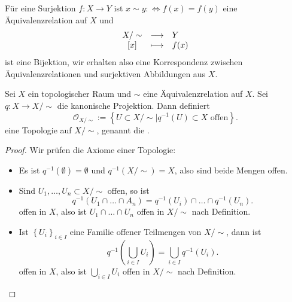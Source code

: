  \begin{recap}
     Für eine Surjektion $f: X \to  Y$ ist $x\sim y :\iff  f(x) = f(y)$ eine Äquivalenzrelation auf $X$ und
             \begin{equation*}
             \begin{array}{c c l} 
             X / \sim  & \longrightarrow & Y \\
             \left[x\right] & \longmapsto &  f(x)
             \end{array}
         \end{equation*}
ist eine Bijektion, wir erhalten also eine Korrespondenz zwischen Äquivalenzrelationen und surjektiven Abbildungen aus $X$.
\end{recap}

\begin{theoremdef}[Quotiententopologie]\label{def:quotiententopologie}
    Sei $X$ ein topologischer Raum und  $\sim $ eine Äquivalenzrelation auf $X$. Sei  $q: X \to  X / \sim $ die kanonische Projektion. Dann definiert
    \[
        \mathcal{O}_{X / \sim } := \left \{U\subset X / \sim \mid  q^{-1}(U) \subset X \text{ offen}\right\} 
    .\] 
    eine Topologie auf $X / \sim $, genannt die . 
\end{theoremdef}
\begin{proof}
    Wir prüfen die Axiome einer Topologie:
    \begin{itemize}
        \item Es ist $q^{-1}(\emptyset) = \emptyset$ und $q^{-1}(X / \sim ) = X$, also sind beide Mengen offen.
        \item Sind $U_1, \ldots,U_n\subset X / \sim $ offen, so ist
            \[
                q^{-1}(U_1\cap \ldots \cap A_n) = q^{-1}(U_i) \cap \ldots \cap q^{-1}(U_n)
            .\] 
            offen in $X$, also ist  $U_1\cap \ldots \cap U_n$ offen in $X / \sim $ nach Definition.
        \item Ist $\left \{U_i\right\} _{i\in I}$ eine Familie offener Teilmengen von $X / \sim $, dann ist
            \[
                q^{-1}\left( \bigcup_{i \in  I} U_i \right) = \bigcup_{i \in I} q^{-1}(U_i)
            .\] 
            offen in $X$, also ist  $\bigcup_{i \in I} U_i$ offen in $X / \sim $ nach Definition.
    \end{itemize}
\end{proof}






